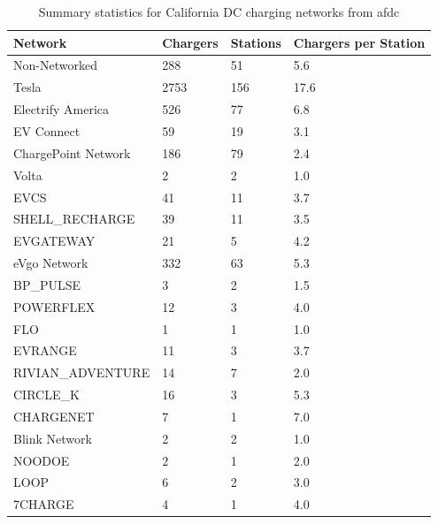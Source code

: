 %
%

\begin{table}[H]
	\centering
	\caption{Summary statistics for California DC charging networks from \gls{afdc}}
	\label{tab:summary_statistics_afdc}
	\begin{tabular}{|C{.46\linewidth}|C{.18\linewidth}|C{.18\linewidth}|C{.18\linewidth}|}
		\hline Network & Chargers & Stations & Chargers per Station \\
		\hline Non-Networked & 288 & 51 & 5.6 \\
		\hline Tesla & 2753 & 156 & 17.6 \\
		\hline Electrify America & 526 & 77 & 6.8 \\
		\hline EV Connect & 59 & 19 & 3.1 \\
		\hline ChargePoint Network & 186 & 79 & 2.4 \\
		\hline Volta & 2 & 2 & 1.0 \\
		\hline EVCS & 41 & 11 & 3.7 \\
		\hline SHELL_RECHARGE & 39 & 11 & 3.5 \\
		\hline EVGATEWAY & 21 & 5 & 4.2 \\
		\hline eVgo Network & 332 & 63 & 5.3 \\
		\hline BP_PULSE & 3 & 2 & 1.5 \\
		\hline POWERFLEX & 12 & 3 & 4.0 \\
		\hline FLO & 1 & 1 & 1.0 \\
		\hline EVRANGE & 11 & 3 & 3.7 \\
		\hline RIVIAN_ADVENTURE & 14 & 7 & 2.0 \\
		\hline CIRCLE_K & 16 & 3 & 5.3 \\
		\hline CHARGENET & 7 & 1 & 7.0 \\
		\hline Blink Network & 2 & 2 & 1.0 \\
		\hline NOODOE & 2 & 1 & 2.0 \\
		\hline LOOP & 6 & 2 & 3.0 \\
		\hline 7CHARGE & 4 & 1 & 4.0 \\
		\hline
	\end{tabular}
\end{table}

